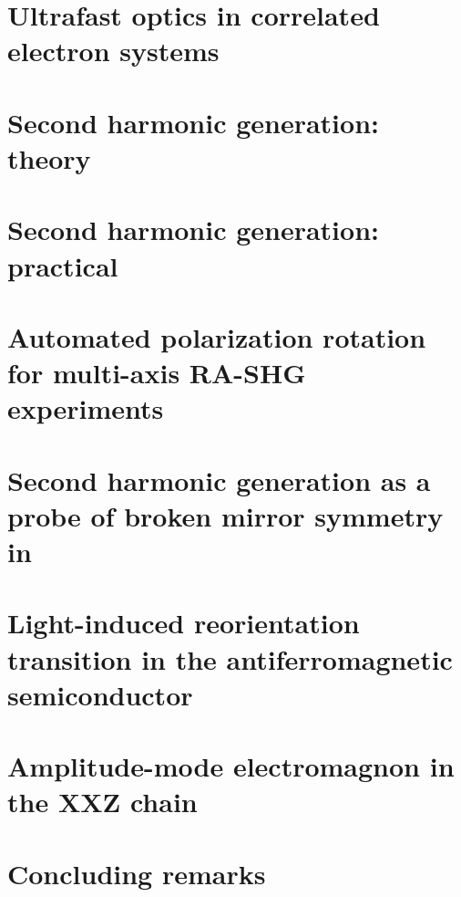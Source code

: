 \documentclass[
    letterpaper,
    12pt,
    openbib,
]{memoir}
\begin{document}
\frontmatter*


\acknowledgements

\clearpage
\preface

\clearpage

\tableofcontents
\clearpage
\listoffigures
\clearpage
\listoftables
\clearpage

\mainmatter*
\chapter{Ultrafast optics in correlated electron systems\label{ch:intro}}

\chapter{Second harmonic generation: theory\label{ch:shgtheory}}

\chapter{Second harmonic generation: practical}\label{ch:shgpractice}

\chapter{Automated polarization rotation for multi-axis RA-SHG experiments}\label{ch:polrotators}

\chapter{Second harmonic generation as a probe of broken mirror symmetry in \tastwo}\label{ch:tastwo}

\chapter{Light-induced reorientation transition in the antiferromagnetic semiconductor }\label{ch:cmb}

\chapter{Amplitude-mode electromagnon in the XXZ chain }\label{ch:cubr2}
\chapter{Concluding remarks}\label{ch:conclusion}

\backmatter*

\end{document}
